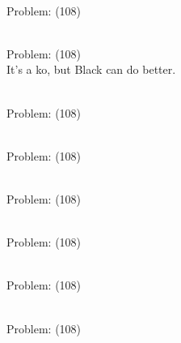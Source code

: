 \documentclass[11pt]{article}
\begin{document}
\begin{minipage}[t]{0.5\textwidth}
  {\centering
  
\\
Problem: (108)\\
  }
\end{minipage}
\begin{minipage}[t]{0.5\textwidth}
  {\centering
  
\\
Problem: (108)\\
It's a ko, but Black can do better.\\
  }
\end{minipage}
\begin{minipage}[t]{0.5\textwidth}
  {\centering
  
\\
Problem: (108)\\
  }
\end{minipage}
\begin{minipage}[t]{0.5\textwidth}
  {\centering
  
\\
Problem: (108)\\
  }
\end{minipage}
\begin{minipage}[t]{0.5\textwidth}
  {\centering
  
\\
Problem: (108)\\
  }
\end{minipage}
\begin{minipage}[t]{0.5\textwidth}
  {\centering
  
\\
Problem: (108)\\
  }
\end{minipage}
\begin{minipage}[t]{0.5\textwidth}
  {\centering
  
\\
Problem: (108)\\
  }
\end{minipage}
\begin{minipage}[t]{0.5\textwidth}
  {\centering
  
\\
Problem: (108)\\
  }
\end{minipage}
\end{document}
